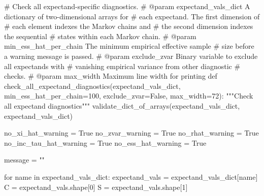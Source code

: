 \documentclass[
  letterpaper,
  DIV=11,
  numbers=noendperiod]{scrartcl}
\newenvironment{Shaded}{\begin{snugshade}}{\end{snugshade}}
\newcommand{\CommentTok}[1]{\textcolor[rgb]{0.37,0.37,0.37}{#1}}
\newcommand{\ControlFlowTok}[1]{\textcolor[rgb]{0.00,0.23,0.31}{#1}}
\newcommand{\DecValTok}[1]{\textcolor[rgb]{0.68,0.00,0.00}{#1}}
\newcommand{\KeywordTok}[1]{\textcolor[rgb]{0.00,0.23,0.31}{#1}}
\newcommand{\NormalTok}[1]{\textcolor[rgb]{0.00,0.23,0.31}{#1}}
\newcommand{\OperatorTok}[1]{\textcolor[rgb]{0.37,0.37,0.37}{#1}}
\newcommand{\StringTok}[1]{\textcolor[rgb]{0.13,0.47,0.30}{#1}}
\newcommand{\VariableTok}[1]{\textcolor[rgb]{0.07,0.07,0.07}{#1}}
\begin{document}
\begin{Shaded}
\begin{Highlighting}[]
\CommentTok{\# Check all expectand{-}specific diagnostics.}
\CommentTok{\# @param expectand\_vals\_dict A dictionary of two{-}dimensional arrays for}
\CommentTok{\#                            each expectand.  The first dimension of}
\CommentTok{\#                            each element indexes the Markov chains and}
\CommentTok{\#                            the second dimension indexes the sequential}
\CommentTok{\#                            states within each Markov chain.}
\CommentTok{\# @param min\_ess\_hat\_per\_chain The minimum empirical effective sample}
\CommentTok{\#                              size before a warning message is passed.}
\CommentTok{\# @param exclude\_zvar Binary variable to exclude all expectands with}
\CommentTok{\#                     vanishing empirical variance from other diagnostic}
\CommentTok{\#                     checks.}
\CommentTok{\# @param max\_width Maximum line width for printing}
\KeywordTok{def}\NormalTok{ check\_all\_expectand\_diagnostics(expectand\_vals\_dict,}
\NormalTok{                                    min\_ess\_hat\_per\_chain}\OperatorTok{=}\DecValTok{100}\NormalTok{,}
\NormalTok{                                    exclude\_zvar}\OperatorTok{=}\VariableTok{False}\NormalTok{,}
\NormalTok{                                    max\_width}\OperatorTok{=}\DecValTok{72}\NormalTok{):}
  \CommentTok{"""Check all expectand diagnostics"""}
\NormalTok{  validate\_dict\_of\_arrays(expectand\_vals\_dict, }\StringTok{\textquotesingle{}expectand\_vals\_dict\textquotesingle{}}\NormalTok{)}
  
\NormalTok{  no\_xi\_hat\_warning }\OperatorTok{=} \VariableTok{True} 
\NormalTok{  no\_zvar\_warning }\OperatorTok{=} \VariableTok{True}
\NormalTok{  no\_rhat\_warning }\OperatorTok{=} \VariableTok{True}
\NormalTok{  no\_inc\_tau\_hat\_warning }\OperatorTok{=} \VariableTok{True}
\NormalTok{  no\_ess\_hat\_warning }\OperatorTok{=} \VariableTok{True}
  
\NormalTok{  message }\OperatorTok{=} \StringTok{""}
  
  \ControlFlowTok{for}\NormalTok{ name }\KeywordTok{in}\NormalTok{ expectand\_vals\_dict:}
\NormalTok{    expectand\_vals }\OperatorTok{=}\NormalTok{ expectand\_vals\_dict[name]}
\NormalTok{    C }\OperatorTok{=}\NormalTok{ expectand\_vals.shape[}\DecValTok{0}\NormalTok{]}
\NormalTok{    S }\OperatorTok{=}\NormalTok{ expectand\_vals.shape[}\DecValTok{1}\NormalTok{]}
    

\end{Highlighting}
\end{Shaded}
\end{document}
